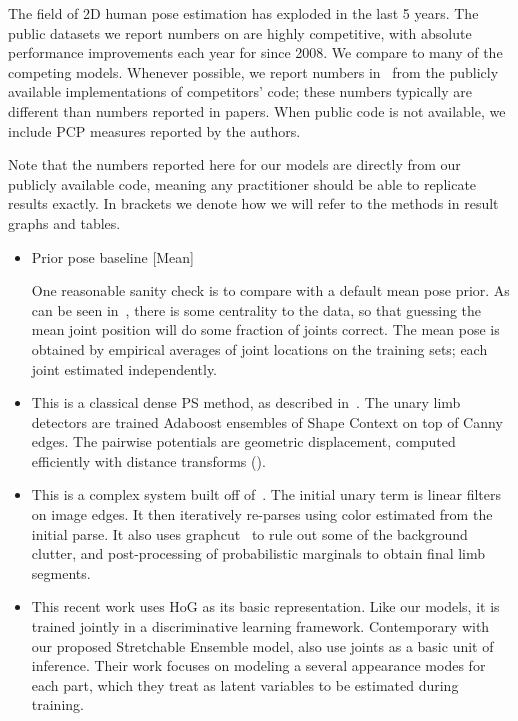 The field of 2D human pose estimation has exploded in the last 5 years.  The 
public datasets we report numbers on are highly competitive, with absolute 
performance improvements each year for since 2008.  We compare to many of the 
competing models.  Whenever possible, we report numbers in~ 
from the publicly available implementations of competitors' code; these numbers 
typically are different than numbers reported in papers.  When public code is 
not available, we include PCP measures reported by the authors.

Note that the numbers reported here for our models are directly from our 
publicly available code, meaning any practitioner should be able to replicate 
results exactly. In brackets we denote how we will refer to the methods in 
result graphs and tables.

\begin{itemize}
\item Prior pose baseline [Mean]

One reasonable sanity check is to compare with a default mean pose prior.  As 
can be seen in~, there is some centrality to the 
data, so that guessing the mean joint position will do some fraction of joints 
correct.  The mean pose is obtained by empirical averages of joint locations on 
the training sets; each joint estimated independently.

\item \citet{andriluka09} 

This is a classical dense PS method, as described in~.  The unary 
limb detectors are trained Adaboost ensembles of Shape Context on top of Canny 
edges.  The pairwise potentials are geometric displacement, computed 
efficiently with distance transforms ().

\item \citet{eichner09} 

This is a complex system built off of~\citet{devacrf}.  The initial unary term 
is linear filters on image edges.  It then iteratively re-parses using color 
estimated from the initial parse.  It also uses graphcut~\citep{boykov2001} to 
rule out some of the background clutter, and post-processing of probabilistic 
marginals to obtain final limb segments.

\item \citet{deva2011} 

This recent work uses HoG as its basic representation.  Like our models, it is 
trained jointly in a discriminative learning framework.  Contemporary with our 
proposed Stretchable Ensemble model, \citet{deva2011} also use joints as a 
basic unit of inference.  Their work focuses on modeling a several appearance 
modes for each part, which they treat as latent variables to be estimated 
during training.  \end{itemize}


